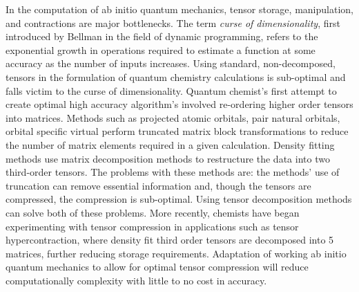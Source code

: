 	In the computation of ab initio quantum mechanics, tensor storage, manipulation, and contractions are major bottlenecks. The term {\em curse of dimensionality}, first introduced by Bellman\cite{Chen2009} in the field of dynamic programming, refers to the exponential growth in operations required to estimate a function at some accuracy as the number of inputs increases. Using standard, non-decomposed, tensors in the formulation of quantum chemistry calculations is sub-optimal and falls victim to the curse of dimensionality.  
	Quantum chemist's first attempt to create optimal high accuracy algorithm's involved re-ordering higher order tensors into matrices.  Methods such as projected atomic orbitals, pair natural orbitals, orbital specific virtual perform truncated matrix block transformations to reduce the number of matrix elements required in a given calculation\cite{Yang2012}.  Density fitting methods use matrix decomposition methods to restructure the data into two third-order tensors\cite{Werner2003}. The problems with these methods are: the methods' use of truncation can remove essential information and, though the tensors are compressed, the compression is sub-optimal.  Using tensor decomposition methods can solve both of these problems\cite{Kolda2008}.  More recently, chemists have began experimenting with tensor compression in applications such as tensor hypercontraction\cite{Schutski2017}, where density fit third order tensors are decomposed into 5 matrices, further reducing storage requirements.  Adaptation of working ab initio quantum mechanics to allow for optimal tensor compression will reduce computationally complexity with little to no cost in accuracy.

